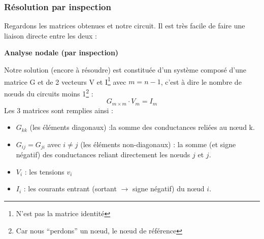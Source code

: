\documentclass[12pt,a4paper]{article}
\begin{document}
\subsubsection[Rés. par inspection]{Résolution par inspection}
\label{subsubsection: nodale par inspection}
Regardons les matrices obtenues et notre circuit. Il est très facile de faire une liaison directe entre les deux : 
\begin{boite} 
	\textbf{Analyse nodale (par inspection)}
	
	Notre solution (encore à résoudre) est constituée d'un système composé d'une matrice G et de 2 vecteurs V et I\footnote{N'est pas la matrice identité} avec $m = n-1$, c'est à dire le nombre de n\oe uds du circuits moins 1\footnote{Car nous ``perdons'' un n\oe ud, le n\oe ud de référence} :
	\[G_{m\times m} \cdot V_{m} = I_{m}\]
	Les 3 matrices sont remplies ainsi :
	\begin{itemize}
		\item 	$G_{kk}$ (les éléments diagonaux) :la somme des conductances reliées au n\oe ud k.
		\item 	$G_{ij} = G_{ji}$ avec $i \neq j$ (les éléments non-diagonaux) : la somme (et signe négatif) des conductances reliant directement les n\oe uds $j$ et $j$.
		\item 	$V_{i}$ : les tensions $v_i$
		\item 	$I_{i}$ : les courants entrant (sortant $\to$ signe négatif) du n\oe ud $i$.
	\end{itemize}
\end{boite}
\end{document}
